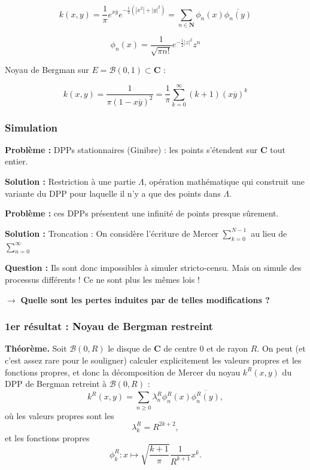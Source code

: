\documentclass{beamer}
\begin{document}
\begin{frame}
    $$ k(x,y) = \frac 1 \pi e^{x \overline y} e^{- \frac 1 2 (|x^2| + |y|^2)} = \sum_{n \in \mathbf N} \phi_n(x) \overline{\phi_n(y)}$$

    $$ \phi_n(x) = \frac{1}{\sqrt{\pi n!}} e^{- \frac 1 2 |z|^2} z^n $$

    \bigskip

    Noyau de Bergman sur $ E = \mathcal B(0,1) \subset \mathbf C $ :

    $$ k(x,y) = \frac{1}{\pi(1-x\overline y)^2} = \frac 1 \pi \sum_{k=0}^\infty (k+1)(x \overline y)^k $$

\end{frame}\begin{frame}\frametitle{Simulation}

    \textbf{Problème :} DPPs stationnaires (Ginibre) : les points s'étendent sur $ \mathbf C $ tout entier. 

    \medskip 

    \textbf{Solution :} Restriction à une partie $ \Lambda $, opération mathématique qui construit une variante du DPP pour laquelle il n'y a que des points dans $ \Lambda $.

    \medskip

    \textbf{Problème :} ces DPPs présentent une infinité de points presque sûrement. 

    \medskip

    \textbf{Solution :} Troncation : On considère l'écriture de Mercer $ \sum_{k=0}^{N-1} $ au lieu de $ \sum_{n=0}^\infty $

    \textbf{Question :} Ils sont donc impossibles à simuler stricto-censu. Mais on simule des processus différents ! Ce ne sont plus les mêmes lois !

    \begin{center} $ \rightarrow $ \textbf{Quelle sont les pertes induites par de telles modifications ?}  \end{center}

\end{frame}\begin{frame}\frametitle{1er résultat : Noyau de Bergman restreint}

    \textbf{Théorème.} Soit $\mathcal{B}(0, R)$ le disque de $ \mathbf C $ de centre $0$ et de rayon $R$. On peut (et c'est assez rare pour le souligner) calculer explicitement les valeurs propres et les fonctions propres, et donc la décomposition de Mercer du noyau $k^R(x,y)$ du DPP de Bergman retreint à $\mathcal{B}(0, R)$ :
    \[
    k^R(x,y) = \sum_{n \ge 0} \lambda_n^R \phi_n^R(x) \overline{\phi_n^R(y)},
    \]
    où les valeurs propres sont les 
    \[
    \lambda_k^R = R^{2k+2},
    \]
    et les fonctions propres
    \[
    \phi_k^R : x \mapsto \sqrt{\frac{k+1}{\pi}} \frac{1}{R^{k+1}} x^k.
    \]


\end{frame}
\end{document}
